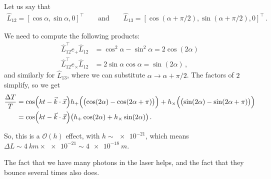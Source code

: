 \documentclass[main.tex]{subfiles}
\begin{document}
Let us say that 
%
\begin{align}
\hat{L}_{12} = [\cos \alpha , \sin \alpha , 0]^{\top} \qquad \text{and} \qquad \hat{L}_{13} = [\cos(\alpha + \pi /2), \sin(\alpha + \pi /2) , 0]^{\top}
\,.
\end{align}

We need to compute the following products: 
%
\begin{subequations}
\begin{align}
\hat{L}_{12}^{\top} e_{+} \hat{L}_{12} &= \cos^2\alpha - \sin^2\alpha =  2\cos(2 \alpha )
\\
\hat{L}_{12}^{\top} e_{ \times } \hat{L}_{12} &= 2 \sin \alpha \cos \alpha = \sin(2 \alpha )
\,,
\end{align}
\end{subequations}
%
and similarly for \(\hat{L}_{13} \), where we can substitute \(\alpha \rightarrow \alpha + \pi /2\). The factors of \(2\) simplify, so we get 
%
\begin{subequations}
\begin{align}
\frac{\Delta T}{T} &= \cos(kt - \vec{k} \cdot \vec{x}) 
h_{+}\qty(  \qty(\cos(2 \alpha ) - \cos(2 \alpha  + \pi ))) + 
h_{ \times } \qty(  \qty(\sin(2 \alpha ) - \sin(2 \alpha  + \pi )))  \\
&= \cos(kt - \vec{k} \cdot \vec{x}) \qty(
h_{+}\cos(2 \alpha ) + 
h_{\times} \sin(2 \alpha ))
\,.
\end{align}
\end{subequations}

So, this is a \(\mathcal{O}(h)\) effect, with \(h \sim \num{e-21}\), which means \(\Delta L  \sim \SI{4}{km} \times \num{e-21} \sim \SI{4e-18}{m}\). 

The fact that we have many photons in the laser helps, and the fact that they bounce several times also does. 

\end{document}
